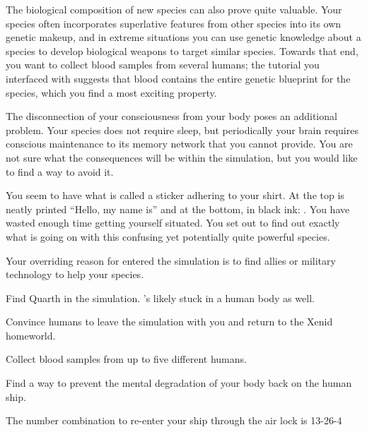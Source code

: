 \documentclass[char]{guildcamp1}
\begin{document}
The biological composition of new species can also prove quite valuable. Your species often incorporates superlative features from other species into its own genetic makeup, and in extreme situations you can use genetic knowledge about a species to develop biological weapons to target similar species. Towards that end, you want to collect blood samples from several humans; the tutorial you interfaced with suggests that blood contains the entire genetic blueprint for the species, which you find a most exciting property.

The disconnection of your consciousness from your body poses an additional problem. Your species does not require sleep, but periodically your brain requires conscious maintenance to its memory network that you cannot provide. You are not sure what the consequences will be within the simulation, but you would like to find a way to avoid it.

You seem to have what is called a sticker adhering to your shirt. At the top is neatly printed ``Hello, my name is'' and at the bottom, in black ink: \cActive{\intro}. You have wasted enough time getting yourself situated. You set out to find out exactly what is going on with this confusing yet potentially quite powerful species.

\begin{itemz}[Goals]
  \item Your overriding reason for entered the simulation is to find allies or military technology to help your species.
  \item Find Quarth in the simulation. \cPassive{\They{}}'s likely stuck in a human body as well.
  \item Convince humans to leave the simulation with you and return to the Xenid homeworld.
  \item Collect blood samples from up to five different humans.
  \item Find a way to prevent the mental degradation of your body back on the human ship.
\end{itemz}

\begin{itemz}[Notes]
  \item The number combination to re-enter your ship through the air lock is 13-26-4
\end{itemz}

\end{document}
